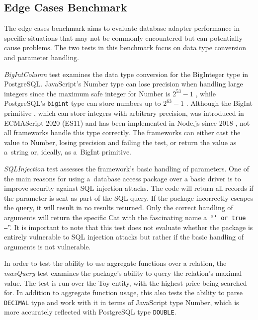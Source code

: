\subsection*{Edge Cases Benchmark}

The edge cases benchmark aims to evaluate database adapter performance in
specific situations that may not be commonly encountered but can potentially
cause problems. The two tests in this benchmark focus on data type conversion
and parameter handling.

\textit{BigIntColumn} test examines the data type conversion for the BigInteger
type in PostgreSQL. JavaScript's Number type can lose precision when handling
large integers since the maximum safe integer for Number is \(2^{53} - 1\)
\cite{MDNNumber}, while PostgreSQL's \texttt{bigint} type can store numbers up
to \(2^{63} - 1\) \cite{PostgresNumeric}. Although the BigInt primitive
\cite{MDNBigInt}, which can store integers with arbitrary precision, was
introduced in ECMAScript 2020 (ES11) \cite{ecma-262} and has been implemented in
Node.js since 2018 \cite{MDNBigInt}, not all frameworks handle this type
correctly. The frameworks can either cast the value to Number, losing precision
and failing the test, or return the value as a~string or, ideally, as a~BigInt
primitive.

\textit{SQLInjection} test assesses the framework's basic handling of
parameters. One of the main reasons for using a~database access package over a
basic driver is to improve security against SQL injection attacks. The code will
return all records if the parameter is sent as part of the SQL query. If the
package incorrectly escapes the query, it will result in no results returned.
Only the correct handling of arguments will return the specific Cat with the
fascinating name a~\enquote{\texttt{' or true --}}. It is important to note that
this test does not evaluate whether the package is entirely vulnerable to SQL
injection attacks but rather if the basic handling of arguments is not
vulnerable.

In order to test the ability to use aggregate functions over a relation, the
\textit{maxQuery} test examines the package's ability to query the relation's
maximal value. The test is run over the Toy entity, with the highest price being
searched for. In addition to aggregate function usage, this also tests the
ability to parse \texttt{DECIMAL} type and work with it in terms of JavaScript
type Number, which is more accurately reflected with PostgreSQL type
\texttt{DOUBLE}.

